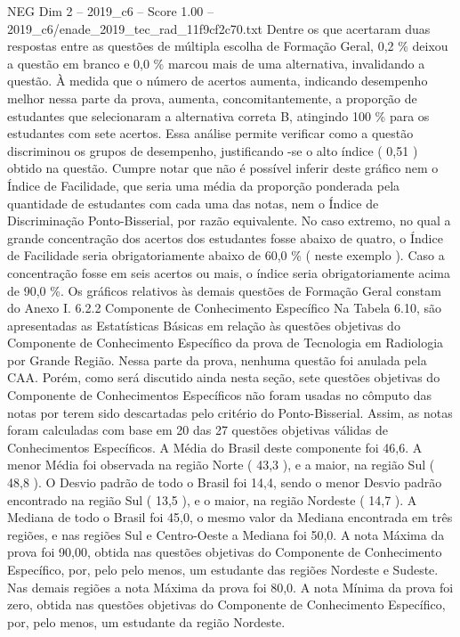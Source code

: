 \begin{textsample}{NEG Dim 2 – 2019\_c6 – Score 1.00 – 2019\_c6/enade\_2019\_tec\_rad\_11f9cf2c70.txt}
Dentre os que acertaram duas respostas entre as questões de múltipla escolha de Formação Geral, 0,2 \% deixou a questão em branco e 0,0 \% marcou mais de uma alternativa, invalidando a questão.
À medida que o número de acertos aumenta, indicando desempenho melhor nessa parte da prova, aumenta, concomitantemente, a proporção de estudantes que selecionaram a alternativa correta B, atingindo 100 \% para os estudantes com sete acertos.
Essa análise permite verificar como a questão discriminou os grupos de desempenho, justificando -se o alto índice ( 0,51 ) obtido na questão.
Cumpre notar que não é possível inferir deste gráfico nem o Índice de Facilidade, que seria uma média da proporção ponderada pela quantidade de estudantes com cada uma das notas, nem o Índice de Discriminação Ponto-Bisserial, por razão equivalente.
No caso extremo, no qual a grande concentração dos acertos dos estudantes fosse abaixo de quatro, o Índice de Facilidade seria obrigatoriamente abaixo de 60,0 \% ( neste exemplo ).
Caso a concentração fosse em seis acertos ou mais, o índice seria obrigatoriamente acima de 90,0 \%.
Os gráficos relativos às demais questões de Formação Geral constam do Anexo I. 6.2.2 Componente de Conhecimento Específico Na Tabela 6.10, são apresentadas as Estatísticas Básicas em relação às questões objetivas do Componente de Conhecimento Específico da prova de Tecnologia em Radiologia por Grande Região.
Nessa parte da prova, nenhuma questão foi anulada pela CAA.
Porém, como será discutido ainda nesta seção, sete questões objetivas do Componente de Conhecimentos Específicos não foram usadas no cômputo das notas por terem sido descartadas pelo critério do Ponto-Bisserial.
Assim, as notas foram calculadas com base em 20 das 27 questões objetivas válidas de Conhecimentos Específicos.
A Média do Brasil deste componente foi 46,6.
A menor Média foi observada na região Norte ( 43,3 ), e a maior, na região Sul ( 48,8 ).
O Desvio padrão de todo o Brasil foi 14,4, sendo o menor Desvio padrão encontrado na região Sul ( 13,5 ), e o maior, na região Nordeste ( 14,7 ).
A Mediana de todo o Brasil foi 45,0, o mesmo valor da Mediana encontrada em três regiões, e nas regiões Sul e Centro-Oeste a Mediana foi 50,0.
A nota Máxima da prova foi 90,00, obtida nas questões objetivas do Componente de Conhecimento Específico, por, pelo pelo menos, um estudante das regiões Nordeste e Sudeste.
Nas demais regiões a nota Máxima da prova foi 80,0.
A nota Mínima da prova foi zero, obtida nas questões objetivas do Componente de Conhecimento Específico, por, pelo menos, um estudante da região Nordeste.

\end{textsample}

